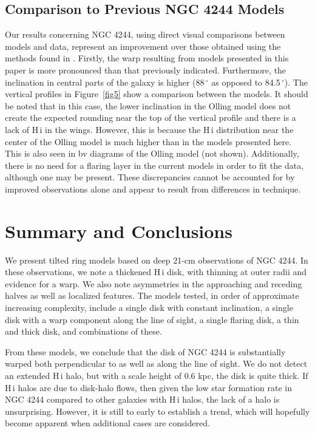 \documentclass{emulateapj}
\begin{document}
\subsection{Comparison to Previous NGC 4244 Models} \label{Section6.5} 
\par
     Our results concerning NGC 4244, using direct visual comparisons between models and data, represent an improvement over those obtained using the methods found in \citet{1996AJ....112..457O}.  Firstly, the warp resulting from models presented in this paper is more pronounced than that previously indicated.  Furthermore, the inclination in central parts of the galaxy is higher (88$\,^{\circ}$ as opposed to 84.5$\,^{\circ}$). The vertical profiles in Figure~\ref{fig5} show a comparison between the models.  It should be noted that in this case, the lower inclination in the Olling model does not create the expected rounding near the top of the vertical profile and there is a lack of {\sc H\,i} in the wings.  However, this is because the {\sc H\,i} distribution near the center of the Olling model is much higher than in the models presented here.  This is also seen in bv diagrams of the Olling model (not shown). Additionally, there is no need for a flaring layer in the current models in order to fit the data, although one may be present.  These discrepancies cannot be accounted for by improved observations alone and appear to result from differences in technique.  

\section{Summary and Conclusions} \label{Section7}

\par
    We present tilted ring models based on deep 21-cm observations of NGC 4244.  In these observations, we note a thickened {\sc H\,i} disk, with thinning at outer radii and evidence for a warp.  We also note asymmetries in the approaching and receding halves as well as localized features.  The models tested, in order of approximate increasing complexity, include a single disk with constant inclination, a single disk with a warp component along the line of sight, a single flaring disk, a thin and thick disk, and combinations of these.

\par
     From these models, we conclude that the disk of NGC 4244 is substantially warped both perpendicular to as well as along the line of sight.  We do not detect an extended {\sc H\,i} halo, but with a scale height of 0.6 kpc, the disk is quite thick.  If {\sc H\,i} halos are due to disk-halo flows, then given the low star formation rate in NGC 4244 compared to other galaxies with {\sc H\,i} halos, the lack of a halo is unsurprising.  However, it is still to early to establish a trend, which will hopefully become apparent when additional cases are considered.
\end{document}
